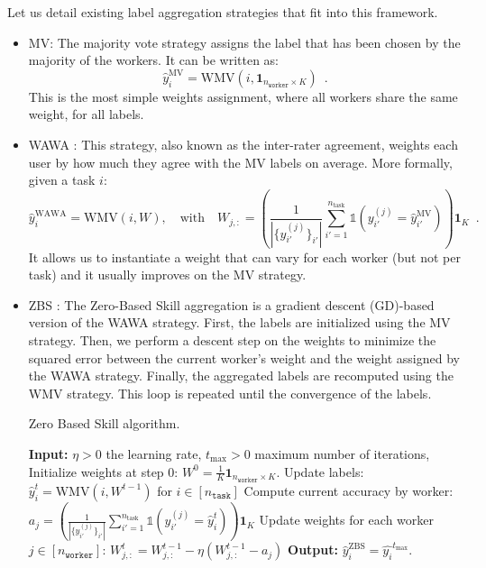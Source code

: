 \documentclass{cap2024}
\begin{document}
Let us detail existing label aggregation strategies that fit into this framework.
\begin{itemize}
  \item MV: The majority vote strategy assigns the label that has been chosen by the majority of the workers. It can be written as:
    \begin{equation}
      \label{eq:mv}
      \hat{y}_i^{\text{MV}} = \mathrm{WMV}(i,\mathbf{1}_{n_\texttt{worker}\times K})\enspace.
    \end{equation}
    This is the most simple weights assignment, where all workers share the same weight, for all labels.
    \item WAWA \citep{appen_wawa_2021}: This strategy, also known as the inter-rater agreement, weights each user by how much they agree with the MV labels on average. More formally, given a task $i$:
    \begin{equation}
      \hat{y}_i^\text{WAWA}= \mathrm{WMV}\left(i,W\right),\quad
      \text{with}\quad W_{j,:} = \left(\frac{1}{|\{y_{i'}^{(j)}\}_{i'}|} \sum_{i'=1}^{n_{\mathrm{task}}} \mathds{1}\left(y_{i'}^{(j)} = \hat{y}_{i'}^\text{MV}\right)\right)\mathbf{1}_{K}\enspace.
    \end{equation}
    It allows us to instantiate a weight that can vary for each worker (but not per task) and it usually improves on the MV strategy.
    \item ZBS \citep{CrowdKit2023}: The Zero-Based Skill aggregation is a gradient descent (GD)-based version of the WAWA strategy.
    First, the labels are initialized using the MV strategy. Then, we perform a descent step on the weights to minimize the squared error between the current worker's weight and the weight assigned by the WAWA strategy. Finally, the aggregated labels are recomputed using the WMV strategy. This loop is repeated until the convergence of the labels.
    \begin{algorithm}
      \caption{Zero Based Skill algorithm.}
      \begin{algorithmic}[1]
        \State \textbf{Input:} $\eta>0$ the learning rate, $t_{\max}>0$ maximum number of iterations,
      \State Initialize weights at step $0$: $W^0=\frac{1}{K} \mathbf{1}_{n_\texttt{worker}\times K}$.
            \State Update labels: $\hat{y}_i^{t} = \mathrm{WMV}(i, W^{t-1})$ for $i\in [n_\texttt{task}]$
            \State Compute current accuracy by worker: $a_j =\left(\frac{1}{|\{y_{i'}^{(j)}\}_{i'}|} \sum_{i'=1}^{n_{\mathrm{task}}} \mathds{1}\left(y_{i'}^{(j)} = \hat{y}_i^t\right)\right)\mathbf{1}_K$
            \State Update weights for each worker $j\in [n_\texttt{worker}]$: $W^t_{j,:} = W^{t-1}_{j, :} - \eta (W^{t-1}_{j,:}-a_j)$
        \EndFor
        \State \textbf{Output:} $\hat{y}_i^\text{ZBS} = \hat{y_i}^{t_{\max}}$.
      \end{algorithmic}
      \end{algorithm}


\end{itemize}
\end{document}
